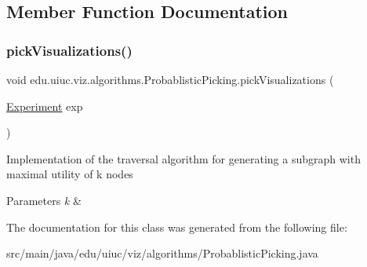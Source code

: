 \subsection{Member Function Documentation}
\mbox{\label{classedu_1_1uiuc_1_1viz_1_1algorithms_1_1_probablistic_picking_a9166d3fa8f4f1057ecbd343fae327362}} 
\subsubsection{\texorpdfstring{pickVisualizations()}{pickVisualizations()}}
{\footnotesize\ttfamily void edu.\+uiuc.\+viz.\+algorithms.\+Probablistic\+Picking.\+pick\+Visualizations (\begin{DoxyParamCaption}\item[{\mbox{\hyperlink{classedu_1_1uiuc_1_1viz_1_1algorithms_1_1_experiment}{Experiment}}}]{exp }\end{DoxyParamCaption})}

Implementation of the traversal algorithm for generating a subgraph with maximal utility of k nodes


\begin{DoxyParams}{Parameters}
{\em k} & \\
\hline
\end{DoxyParams}


The documentation for this class was generated from the following file\+:\begin{DoxyCompactItemize}
\item 
src/main/java/edu/uiuc/viz/algorithms/Probablistic\+Picking.\+java\end{DoxyCompactItemize}
